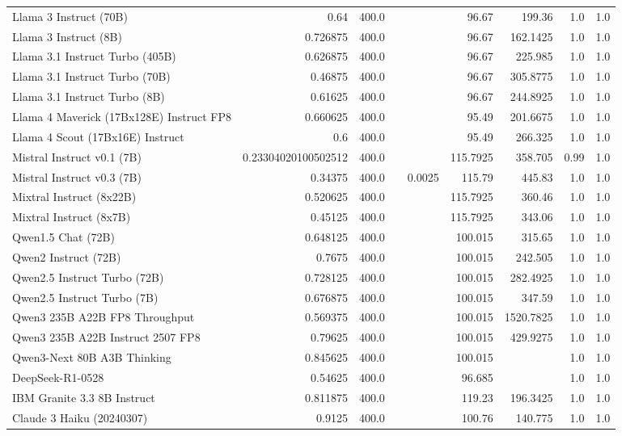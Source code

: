 \begin{table}[htp]
{\begin{tabular}{lrrrrrrrr}
Llama 3 Instruct (70B) & 0.64 & 400.0 &  &  & 96.67 & 199.36 & 1.0 & 1.0 \\
Llama 3 Instruct (8B) & 0.726875 & 400.0 &  &  & 96.67 & 162.1425 & 1.0 & 1.0 \\
Llama 3.1 Instruct Turbo (405B) & 0.626875 & 400.0 &  &  & 96.67 & 225.985 & 1.0 & 1.0 \\
Llama 3.1 Instruct Turbo (70B) & 0.46875 & 400.0 &  &  & 96.67 & 305.8775 & 1.0 & 1.0 \\
Llama 3.1 Instruct Turbo (8B) & 0.61625 & 400.0 &  &  & 96.67 & 244.8925 & 1.0 & 1.0 \\
Llama 4 Maverick (17Bx128E) Instruct FP8 & 0.660625 & 400.0 &  &  & 95.49 & 201.6675 & 1.0 & 1.0 \\
Llama 4 Scout (17Bx16E) Instruct & 0.6 & 400.0 &  &  & 95.49 & 266.325 & 1.0 & 1.0 \\
Mistral Instruct v0.1 (7B) & 0.23304020100502512 & 400.0 &  &  & 115.7925 & 358.705 & 0.99 & 1.0 \\
Mistral Instruct v0.3 (7B) & 0.34375 & 400.0 &  & 0.0025 & 115.79 & 445.83 & 1.0 & 1.0 \\
Mixtral Instruct (8x22B) & 0.520625 & 400.0 &  &  & 115.7925 & 360.46 & 1.0 & 1.0 \\
Mixtral Instruct (8x7B) & 0.45125 & 400.0 &  &  & 115.7925 & 343.06 & 1.0 & 1.0 \\
Qwen1.5 Chat (72B) & 0.648125 & 400.0 &  &  & 100.015 & 315.65 & 1.0 & 1.0 \\
Qwen2 Instruct (72B) & 0.7675 & 400.0 &  &  & 100.015 & 242.505 & 1.0 & 1.0 \\
Qwen2.5 Instruct Turbo (72B) & 0.728125 & 400.0 &  &  & 100.015 & 282.4925 & 1.0 & 1.0 \\
Qwen2.5 Instruct Turbo (7B) & 0.676875 & 400.0 &  &  & 100.015 & 347.59 & 1.0 & 1.0 \\
Qwen3 235B A22B FP8 Throughput & 0.569375 & 400.0 &  &  & 100.015 & 1520.7825 & 1.0 & 1.0 \\
Qwen3 235B A22B Instruct 2507 FP8 & 0.79625 & 400.0 &  &  & 100.015 & 429.9275 & 1.0 & 1.0 \\
Qwen3-Next 80B A3B Thinking & 0.845625 & 400.0 &  &  & 100.015 &  & 1.0 & 1.0 \\
DeepSeek-R1-0528 & 0.54625 & 400.0 &  &  & 96.685 &  & 1.0 & 1.0 \\
IBM Granite 3.3 8B Instruct & 0.811875 & 400.0 &  &  & 119.23 & 196.3425 & 1.0 & 1.0 \\
Claude 3 Haiku (20240307) & 0.9125 & 400.0 &  &  & 100.76 & 140.775 & 1.0 & 1.0 \\

\end{tabular}}
\end{table}
